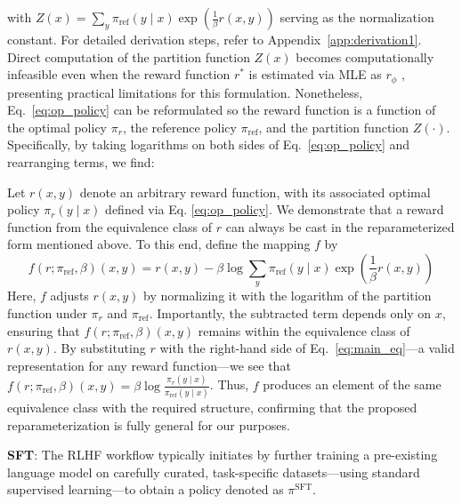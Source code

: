with $Z(x) =\sum_{y}\pi_\text{ref}(y\mid x)\exp\left(\frac{1}{\beta}r(x, y)\right)$ serving as the normalization constant. For detailed derivation steps, refer to Appendix~\ref{app:derivation1}. Direct computation of the partition function $Z(x)$ becomes computationally infeasible even when the reward function $r^*$ is estimated via MLE as $r_{\phi}$ \citep{korbak2022reinforcement, go2023aligning}, presenting practical limitations for this formulation. Nonetheless, Eq.~\ref{eq:op_policy} can be reformulated so the reward function is a function of the optimal policy $\pi_r$, the reference policy $\pi_\text{ref}$, and the partition function $Z(\cdot)$. Specifically, by taking logarithms on both sides of Eq.~\ref{eq:op_policy} and rearranging terms, we find:

\begin{sproof}
    Let $r(x, y)$ denote an arbitrary reward function, with its associated optimal policy $\pi_r(y \mid x)$ defined via Eq. \ref{eq:op_policy}. We demonstrate that a reward function from the equivalence class of $r$ can always be cast in the reparameterized form mentioned above. To this end, define the mapping $f$ by
\begin{equation}
    f(r; \pi_\text{ref}, \beta)(x, y) = r(x, y) - \beta\log\sum_{y}\pi_\text{ref}(y\mid x)\exp\left(\frac{1}{\beta}r(x, y)\right)
\end{equation}
Here, $f$ adjusts $r(x, y)$ by normalizing it with the logarithm of the partition function under $\pi_r$ and $\pi_\text{ref}$. Importantly, the subtracted term depends only on $x$, ensuring that $f(r; \pi_\text{ref}, \beta)(x, y)$ remains within the equivalence class of $r(x, y)$. By substituting $r$ with the right-hand side of Eq.~\ref{eq:main_eq}—a valid representation for any reward function—we see that $f(r; \pi_\text{ref}, \beta)(x, y) = \beta \log \frac{\pi_r(y\mid x)}{\pi_\text{ref}(y\mid x)}$. Thus, $f$ produces an element of the same equivalence class with the required structure, confirming that the proposed reparameterization is fully general for our purposes.
\end{sproof}

\textbf{SFT}: The RLHF workflow typically initiates by further training a pre-existing language model on carefully curated, task-specific datasets—using standard supervised learning—to obtain a policy denoted as $\pi^\text{SFT}$.

